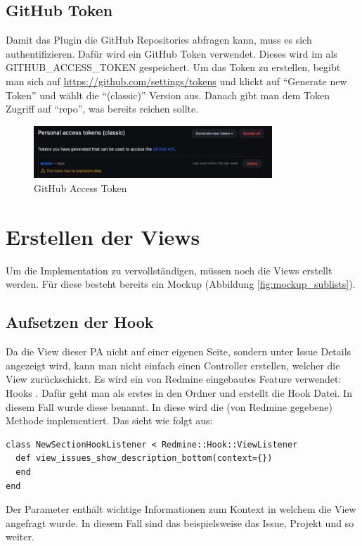 \subsection{GitHub Token}
Damit das Plugin die GitHub Repositories abfragen kann, muss es sich authentifizieren. Dafür wird ein GitHub
Token verwendet. Dieses wird im  als GITHUB\_ACCESS\_TOKEN gespeichert.
\newline
Um das Token zu erstellen, begibt man sich auf \url{https://github.com/settings/tokens} und klickt auf
\enquote{Generate new Token} und wählt die \enquote{(classic)} Version aus. Danach gibt man dem Token Zugriff
auf \enquote{repo}, was bereits reichen sollte.
\begin{figure}[H]
  \centering
  \includegraphics[width=0.8\textwidth]{images/misc/github-access-token.png}
  \caption[Screenshot des GitHub Access Tokens]{GitHub Access Token}
  \label{fig:setup_github_token}
\end{figure}

\section{Erstellen der Views}
Um die Implementation zu vervollständigen, müssen noch die Views erstellt werden. Für diese besteht bereits ein
Mockup (Abbildung \ref{fig:mockup_sublists}).
\subsection{Aufsetzen der Hook}
Da die View dieser PA nicht auf einer eigenen Seite, sondern unter Issue Details angezeigt wird, kann man nicht
einfach einen Controller erstellen, welcher die View zurückschickt. Es wird ein von Redmine eingebautes Feature
verwendet: Hooks \cite{redmine_hooks}. \newline
Dafür geht man als erstes in den  Ordner und erstellt die Hook Datei. In diesem Fall wurde
diese  benannt. In diese wird die (von Redmine gegebene)
 Methode implementiert. Das sieht wie folgt aus:
\begin{codebox}[]
  \begin{verbatim}
class NewSectionHookListener < Redmine::Hook::ViewListener
  def view_issues_show_description_bottom(context={})
  end
end
  \end{verbatim}
\end{codebox}
Der Parameter  enthält wichtige Informationen zum Kontext in welchem die View 
angefragt wurde. In diesem Fall sind das beispielsweise das Issue, Projekt und so weiter. \newline
